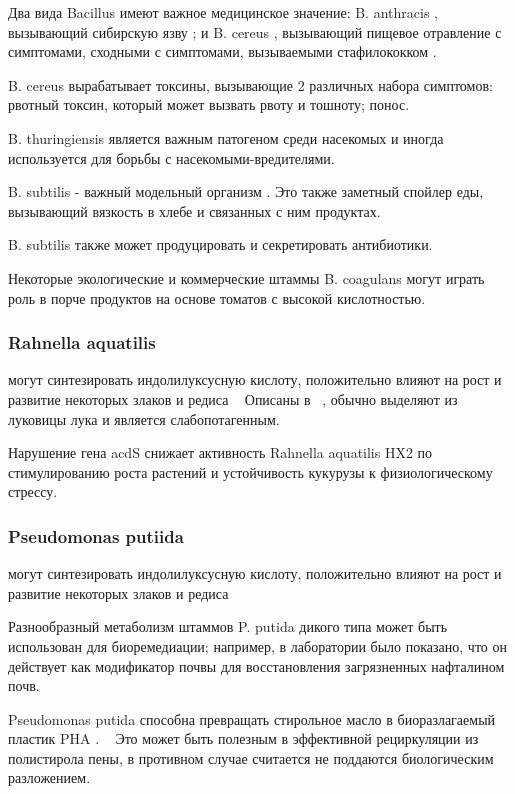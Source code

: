 \documentclass[11pt]{article}
\begin{document}
    Два вида Bacillus имеют важное медицинское значение: B. anthracis , вызывающий сибирскую язву ; и B. cereus , вызывающий пищевое отравление с симптомами, сходными с симптомами, вызываемыми стафилококком . ~\cite{Bacillus_22}
    
    B. cereus вырабатывает токсины, вызывающие 2 различных набора симптомов: рвотный токсин, который может вызвать рвоту и тошноту; понос.
    
    B. thuringiensis является важным патогеном среди насекомых и иногда используется для борьбы с насекомыми-вредителями.
    
    B. subtilis - важный модельный организм . Это также заметный спойлер еды, вызывающий вязкость в хлебе и связанных с ним продуктах.
    
    B. subtilis также может продуцировать и секретировать антибиотики.
    
    Некоторые экологические и коммерческие штаммы B. coagulans могут играть роль в порче продуктов на основе томатов с высокой кислотностью.
	   
	\subsubsection{Rahnella aquatilis}
	могут синтезировать индолилуксусную кислоту, положительно влияют на рост и развитие некоторых злаков и редиса ~\cite{9781118297674.ch36}
	Описаны в ~\cite{Rahnella_aquatilis_1}, обычно выделяют из луковицы лука и является слабопотагенным.

Нарушение гена acdS снижает активность Rahnella aquatilis HX2 по стимулированию роста растений и устойчивость кукурузы к физиологическому стрессу. ~\cite{Rahnella_aquatilis_2}
	
	\subsubsection{	Pseudomonas putiida}
	могут синтезировать индолилуксусную кислоту, положительно влияют на рост и развитие некоторых злаков и редиса ~\cite{9781118297674.ch36}
	
	Разнообразный метаболизм штаммов P. putida дикого типа может быть использован для биоремедиации; например, в лаборатории было показано, что он действует как модификатор почвы для восстановления загрязненных нафталином почв. ~\cite{Pseudomonas_putiida_4}
	
	Pseudomonas putida способна превращать стирольное масло в биоразлагаемый пластик PHA . ~\cite{Pseudomonas_putiida_5, Pseudomonas_putiida_6 } Это может быть полезным в эффективной рециркуляции из полистирола пены, в противном случае считается не поддаются биологическим разложением.
	
\end{document}
